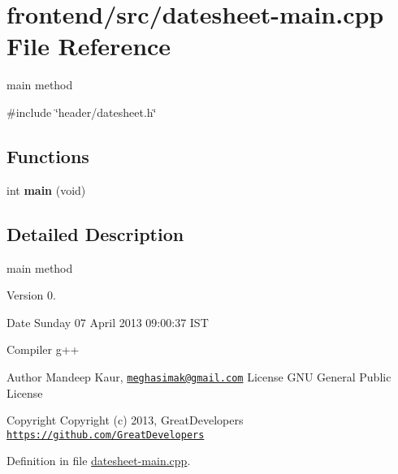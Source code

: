 \hypertarget{datesheet-main_8cpp}{\section{frontend/src/datesheet-\/main.cpp \-File \-Reference}
\label{datesheet-main_8cpp}
}


main method  


{\ttfamily \#include \char`\"{}header/datesheet.\-h\char`\"{}}\*
\subsection*{\-Functions}
\begin{DoxyCompactItemize}
\item 
\hypertarget{datesheet-main_8cpp_a840291bc02cba5474a4cb46a9b9566fe}{int {\bfseries main} (void)}\label{datesheet-main_8cpp_a840291bc02cba5474a4cb46a9b9566fe}

\end{DoxyCompactItemize}


\subsection{\-Detailed \-Description}
main method \begin{DoxyVersion}{\-Version}
0. 
\end{DoxyVersion}
\begin{DoxyDate}{\-Date}
\-Sunday 07 \-April 2013 09\-:00\-:37 \-I\-S\-T\par
 \-Compiler g++
\end{DoxyDate}
\begin{DoxyAuthor}{\-Author}
\-Mandeep \-Kaur, \href{mailto:meghasimak@gmail.com}{\tt meghasimak@gmail.\-com} \-License \-G\-N\-U \-General \-Public \-License 
\end{DoxyAuthor}
\begin{DoxyCopyright}{\-Copyright}
\-Copyright (c) 2013, \-Great\-Developers \href{https://github.com/GreatDevelopers}{\tt https\-://github.\-com/\-Great\-Developers} 
\end{DoxyCopyright}


\-Definition in file \hyperlink{datesheet-main_8cpp_source}{datesheet-\/main.\-cpp}.


